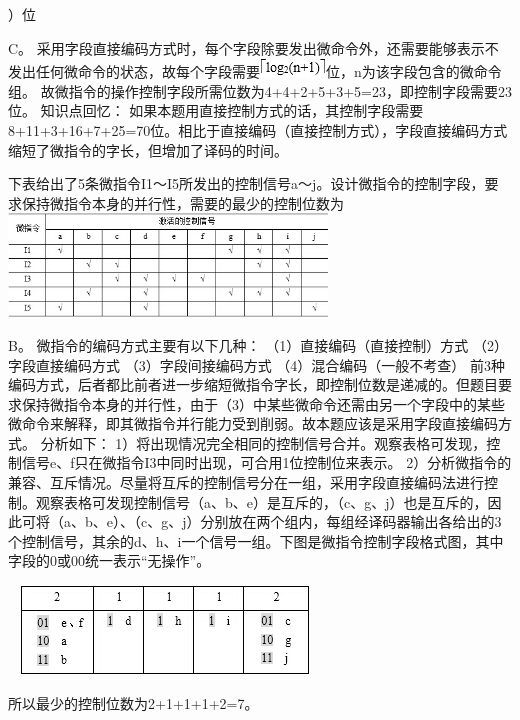 ）位
\par{}
\begin{solution}C。
采用字段直接编码方式时，每个字段除要发出微命令外，还需要能够表示不发出任何微命令的状态，故每个字段需要\includegraphics[width=0.68750in,height=0.19792in]{computerassets/192b018e4f8f9385b44d3c130841491a.jpeg}位，n为该字段包含的微命令组。
故微指令的操作控制字段所需位数为4+4+2+5+3+5=23，即控制字段需要23位。
知识点回忆：
如果本题用直接控制方式的话，其控制字段需要8+11+3+16+7+25=70位。相比于直接编码（直接控制方式），字段直接编码方式缩短了微指令的字长，但增加了译码的时间。
\end{solution}
\question 下表给出了5条微指令I1～I5所发出的控制信号a～j。设计微指令的控制字段，要求保持微指令本身的并行性，需要的最少的控制位数为
\includegraphics[width=3.33333in,height=1.08333in]{computerassets/5b1bab1abb87d9250f00d12856549ee7.jpeg}
\par{}
\begin{solution}B。 微指令的编码方式主要有以下几种： （1）直接编码（直接控制）方式
（2）字段直接编码方式 （3）字段间接编码方式 （4）混合编码（一般不考查）
前3种编码方式，后者都比前者进一步缩短微指令字长，即控制位数是递减的。但题目要求保持微指令本身的并行性，由于（3）中某些微命令还需由另一个字段中的某些微命令来解释，即其微指令并行能力受到削弱。故本题应该是采用字段直接编码方式。
分析如下：
1）将出现情况完全相同的控制信号合并。观察表格可发现，控制信号e、f只在微指令I3中同时出现，可合用1位控制位来表示。
2）分析微指令的兼容、互斥情况。尽量将互斥的控制信号分在一组，采用字段直接编码法进行控制。观察表格可发现控制信号（a、b、e）是互斥的，（c、g、j）也是互斥的，因此可将（a、b、e）、（c、g、j）分别放在两个组内，每组经译码器输出各给出的3个控制信号，其余的d、h、i一个信号一组。下图是微指令控制字段格式图，其中字段的0或00统一表示``无操作''。

~
\includegraphics[width=3.02083in,height=0.93750in]{computerassets/4e16b737bedeef5f63b46047bbfe2996.jpeg}~

所以最少的控制位数为2+1+1+1+2=7。
\end{solution}
